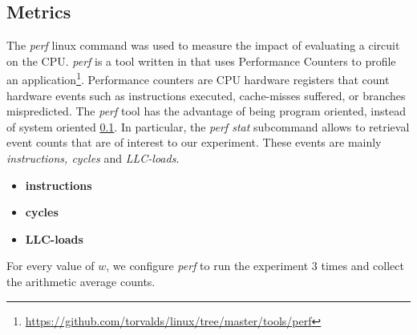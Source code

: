 \subsection{Metrics}
The \textit{perf} linux command was used to measure the impact of evaluating a circuit on the CPU. \textit{perf} is a tool written in  that uses Performance Counters to profile an application\footnote{\url{https://github.com/torvalds/linux/tree/master/tools/perf}}. Performance counters are CPU hardware registers that count hardware events such as instructions executed, cache-misses suffered, or branches mispredicted\cite{perf}. The \textit{perf} tool has the advantage of being program oriented, instead of system oriented \ref{}.   In particular, the \textit{perf stat} subcommand allows to retrieval event counts that are of interest to our experiment. These events are mainly \textit{instructions, cycles} and \textit{LLC-loads}. 
\begin{itemize}
\item \textbf{instructions}
\item \textbf{cycles}
\item \textbf{LLC-loads}
\end{itemize}
For every value of $w$, we configure \textit{perf} to run the experiment 3 times and collect the arithmetic average counts.





